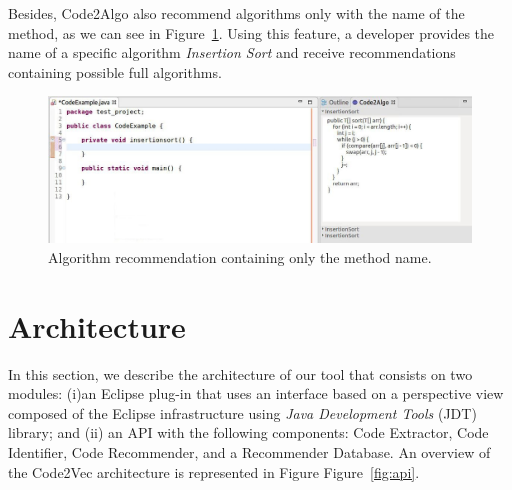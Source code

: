 \documentclass[12pt]{article}
\begin{document}
    Besides, Code2Algo also recommend algorithms only with the name of the method, as we can see in Figure~\ref{fig:flow}. Using this feature, a developer provides the name of a specific algorithm \textit{Insertion Sort} and receive recommendations containing possible full algorithms.
    
    \begin{figure}[h]
        \centering
        \includegraphics[width=\linewidth]{cbsoft19/figs/capturename.jpg}
        \caption{Algorithm recommendation containing only the method name.}
        \label{fig:flow}
    \end{figure}
    
    
    \section{Architecture}
    \label{sec:architecture}
    
    In this section, we describe the architecture of our tool that consists on two modules: (i)an Eclipse plug-in that uses an interface based on a perspective view composed of the Eclipse infrastructure using \textit{Java Development Tools} (JDT) library; and (ii) an API with the following components: Code Extractor, Code Identifier, Code Recommender, and a Recommender Database. An overview of the Code2Vec architecture is represented in Figure Figure~\ref{fig:api}. 
    
\end{document}
